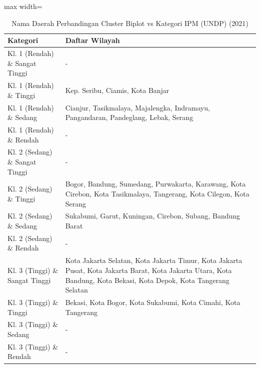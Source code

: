 \begin{table}[H]
\centering
\caption{Nama Daerah Perbandingan Cluster Biplot vs Kategori IPM (UNDP) (2021)} \label{tab:appcrossname2021}
\begin{adjustbox}{max width=\textwidth}
\begin{tabular}{|p{4cm}|p{10cm}|}
\hline
\textbf{Kategori} & \textbf{Daftar Wilayah} \\
\hline
Kl. 1 (Rendah) \& Sangat Tinggi & - \\
\hline
Kl. 1 (Rendah) \& Tinggi & Kep. Seribu, Ciamis, Kota Banjar \\
\hline
Kl. 1 (Rendah) \& Sedang & Cianjur, Tasikmalaya, Majalengka, Indramayu, Pangandaran, Pandeglang, Lebak, Serang \\
\hline
Kl. 1 (Rendah) \& Rendah & - \\
\hline
Kl. 2 (Sedang) \& Sangat Tinggi & - \\
\hline
Kl. 2 (Sedang) \& Tinggi & Bogor, Bandung, Sumedang, Purwakarta, Karawang, Kota Cirebon, Kota Tasikmalaya, Tangerang, Kota Cilegon, Kota Serang \\
\hline
Kl. 2 (Sedang) \& Sedang & Sukabumi, Garut, Kuningan, Cirebon, Subang, Bandung Barat \\
\hline
Kl. 2 (Sedang) \& Rendah & - \\
\hline
Kl. 3 (Tinggi) \& Sangat Tinggi & Kota Jakarta Selatan, Kota Jakarta Timur, Kota Jakarta Pusat, Kota Jakarta Barat, Kota Jakarta Utara, Kota Bandung, Kota Bekasi, Kota Depok, Kota Tangerang Selatan \\
\hline
Kl. 3 (Tinggi) \& Tinggi & Bekasi, Kota Bogor, Kota Sukabumi, Kota Cimahi, Kota Tangerang \\
\hline
Kl. 3 (Tinggi) \& Sedang & - \\
\hline
Kl. 3 (Tinggi) \& Rendah & - \\
\hline
\end{tabular}
\end{adjustbox}
\end{table}